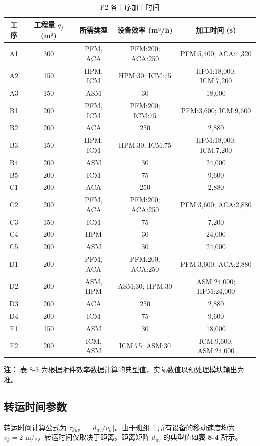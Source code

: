 \documentclass[UTF8,a4paper,12pt]{ctexart}
\begin{document}
\begin{table}[htbp]
  \centering
  \caption{P2 各工序加工时间}
  \label{tab:process_time}
  \begin{tabular}{ccccc}
    \toprule
    工序 & 工程量 $q_j$ (m³) & 所需类型 & 设备效率 (m³/h) & 加工时间 (s) \\
    \midrule
    A1 & 300 & PFM, ACA & PFM:200; ACA:250 & PFM:5,400; ACA:4,320 \\
    A2 & 150 & HPM, ICM & HPM:30; ICM:75 & HPM:18,000; ICM:7,200 \\
    A3 & 150 & ASM & 30 & 18,000 \\
    B1 & 200 & PFM, ICM & PFM:200; ICM:75 & PFM:3,600; ICM:9,600 \\
    B2 & 200 & ACA & 250 & 2,880 \\
    B3 & 150 & HPM, ICM & HPM:30; ICM:75 & HPM:18,000; ICM:7,200 \\
    B4 & 200 & ASM & 30 & 24,000 \\
    B5 & 200 & ICM & 75 & 9,600 \\
    C1 & 200 & ACA & 250 & 2,880 \\
    C2 & 200 & PFM, ACA & PFM:200; ACA:250 & PFM:3,600; ACA:2,880 \\
    C3 & 150 & ICM & 75 & 7,200 \\
    C4 & 200 & HPM & 30 & 24,000 \\
    C5 & 200 & ASM & 30 & 24,000 \\
    D1 & 200 & PFM, ACA & PFM:200; ACA:250 & PFM:3,600; ACA:2,880 \\
    D2 & 200 & ASM, HPM & ASM:30; HPM:30 & ASM:24,000; HPM:24,000 \\
    D3 & 200 & ACA & 250 & 2,880 \\
    D4 & 200 & ICM & 75 & 9,600 \\
    E1 & 150 & ASM & 30 & 18,000 \\
    E2 & 200 & ICM, ASM & ICM:75; ASM:30 & ICM:9,600; ASM:24,000 \\
    \bottomrule
  \end{tabular}
\end{table}
\noindent \textbf{注：} 表 8-3 为根据附件效率数据计算的典型值，实际数值以预处理模块输出为准。

\subsection{转运时间参数}
转运时间计算公式为 $\tau_{kuv} = \lceil d_{uv} / v_k \rceil$。由于班组 1 所有设备的移动速度均为 $v_k = 2$ m/s，转运时间仅取决于距离。距离矩阵 $d_{uv}$ 的典型值如\textbf{表 8-4} 所示。
\end{document}
